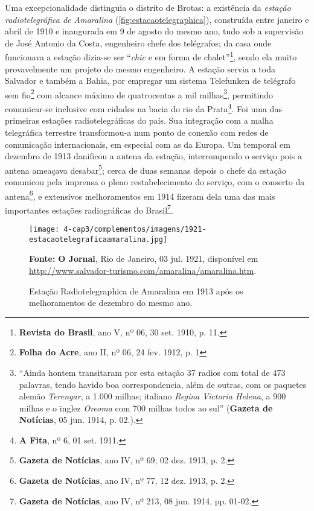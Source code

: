 Uma excepcionalidade distinguia o distrito de Brotas: a existência da \textit{estação radiotelegráfica de Amaralina} (\autoref{fig:estacaotelegraphica}), construída entre janeiro e abril de 1910 e inaugurada em 9 de agosto do mesmo ano, tudo sob a supervisão de José Antonio da Costa, engenheiro chefe dos telégrafos; da casa onde funcionava a estação dizia-se ser ``\textit{chic} e em forma de chalet''\footnote{\textbf{Revista do Brasil}, ano V, nº 06, 30 set. 1910, p. 11.}, sendo ela muito provavelmente um projeto do mesmo engenheiro. A estação servia a toda Salvador e também a Bahia, por empregar um sistema Telefunken de telégrafo sem fio\footnote{\textbf{Folha do Acre}, ano II, nº 06, 24 fev. 1912, p. 1} com alcance máximo de quatrocentas a mil milhas\footnote{``Ainda hontem transitaram por esta estação 37 radios com total de 473 palavras, tendo havido boa correspondencia, além de outras, com os paquetes alemão \textit{Terengar}, a 1.000 milhas; italiano \textit{Regina Victoria Helena}, a 900 milhas e o inglez \textit{Oreoma} com 700 milhas todos ao sul'' (\textbf{Gazeta de Notícias}, 05 jun. 1914, p. 02.).}, permitindo comunicar-se inclusive com cidades na bacia do rio da Prata\footnote{\textbf{A Fita}, nº 6, 01 set. 1911.}. Foi uma das primeiras estações radiotelegráficas do país. Sua integração com a malha telegráfica terrestre transformou-a num ponto de conexão com redes de comunicação internacionais, em especial com as da Europa. Um temporal em dezembro de 1913 danificou a antena da estação, interrompendo o serviço pois a antena ameaçava desabar\footnote{\textbf{Gazeta de Notícias}, ano IV, nº 69, 02 dez. 1913, p. 2.}; cerca de duas semanas depois o chefe da estação comunicou pela imprensa o pleno restabelecimento do serviço, com o conserto da antena\footnote{\textbf{Gazeta de Notícias}, ano IV, nº 77, 12 dez. 1913, p. 2.}, e extensivos melhoramentos em 1914 fizeram dela uma das mais importantes estações radiográficas do Brasil\footnote{\textbf{Gazeta de Notícias}, ano IV, nº 213, 08 jun. 1914, pp. 01-02.}. 

\begin{figure}[!htp]
\centering
\caption{Estação Radiotelegraphica de Amaralina em 1913 após os melhoramentos de dezembro do mesmo ano.}
\texttt{[image: 4-cap3/complementos/imagens/1921-estacaotelegraficaamaralina.jpg]}{\par \footnotesize \textbf{Fonte:} \textbf{O Jornal}, Rio de Janeiro, 03 jul. 1921, disponível em \url{http://www.salvador-turismo.com/amaralina/amaralina.htm}.}
\label{fig:estacaotelegraphica}
\end{figure}

